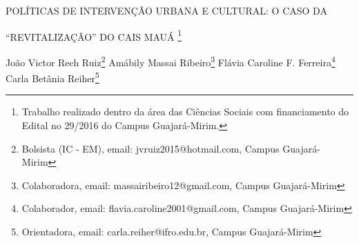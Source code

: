 \documentclass[article,12pt,onesidea,4paper,english,brazil]{abntex2}
\begin{document}
	
	
	\frenchspacing 
	
	\begin{center}
		\LARGE POLÍTICAS DE INTERVENÇÃO URBANA E CULTURAL: O CASO DA
		
		“REVITALIZAÇÃO” DO CAIS MAUÁ \footnote{Trabalho realizado dentro da área das Ciências Sociais com financiamento do Edital no 29/2016 do
			Campus Guajará-Mirim.}
		
		\normalsize
		João Victor Rech Ruiz\footnote{Bolsista (IC - EM), email: jvruiz2015@hotmail.com, Campus Guajará-Mirim} 
		Amábily Massai Ribeiro\footnote{Colaboradora, email: massairibeiro12@gmail.com, Campus Guajará-Mirim} 
		Flávia Caroline F. Ferreira\footnote{Colaborador, email: flavia.caroline2001@gmail.com, Campus Guajará-Mirim} 
		Carla Betânia Reiher\footnote{Orientadora, email: carla.reiher@ifro.edu.br, Campus Guajará-Mirim} 
	\end{center}
	
\end{document}
